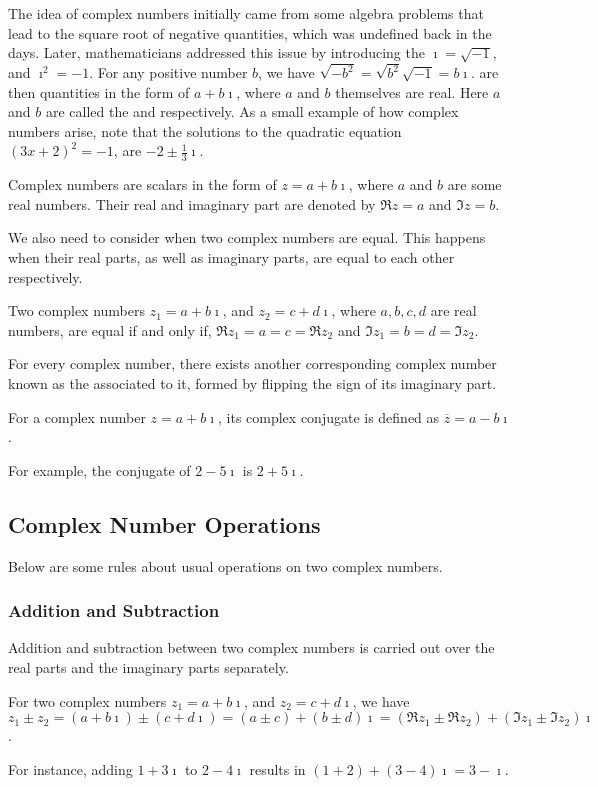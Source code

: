 The idea of complex numbers initially came from some algebra problems that lead to the square root of negative quantities, which was undefined back in the days. Later, mathematicians addressed this issue by introducing the  $\imath = \sqrt{-1}$, and $\imath^2 = -1$. For any positive number $b$, we have $\sqrt{-b^2} = \sqrt{b^2}\sqrt{-1} = b\imath$.  are then quantities in the form of $a + b\imath$, where $a$ and $b$ themselves are real. Here $a$ and $b$ are called the  and  respectively. As a small example of how complex numbers arise, note that the solutions to the quadratic equation $(3x+2)^2 = -1$, are $-2 \pm \frac{1}{3}\imath$.
\begin{defn}
Complex numbers are scalars in the form of $z = a + b\imath$, where $a$ and $b$ are some real numbers. Their real and imaginary part are denoted by $\Re{z} = a$ and $\Im{z} = b$.
\end{defn}
We also need to consider when two complex numbers are equal. This happens when their real parts, as well as imaginary parts, are equal to each other respectively.
\begin{proper}
Two complex numbers $z_1 = a + b\imath$, and $z_2 = c + d\imath$, where $a, b, c, d$ are real numbers, are equal if and only if, $\Re{z_1} = a = c = \Re{z_2}$ and $\Im{z_1} = b = d = \Im{z_2}$.
\end{proper}
For every complex number, there exists another corresponding complex number known as the  associated to it, formed by flipping the sign of its imaginary part.
\begin{defn}
For a complex number $z = a + b\imath$, its complex conjugate is defined as $\overline{z} = a - b\imath$.
\end{defn}
For example, the conjugate of $2-5\imath$ is $2+5\imath$.

\subsection{Complex Number Operations}
Below are some rules about usual operations on two complex numbers.
\subsubsection{Addition and Subtraction}
Addition and subtraction between two complex numbers is carried out over the real parts and the imaginary parts separately.
\begin{defn}
For two complex numbers $z_1 = a + b\imath$, and $z_2 = c + d\imath$, we have\ $z_1 \pm z_2 = (a + b\imath) \pm (c + d\imath) = (a \pm c) + (b \pm d)\imath = (\Re{z_1} \pm \Re{z_2}) + (\Im{z_1} \pm \Im{z_2})\imath$.
\end{defn}
For instance, adding $1 + 3\imath$ to $2 - 4\imath$ results in $(1+2) + (3-4)\imath = 3 - \imath$.

